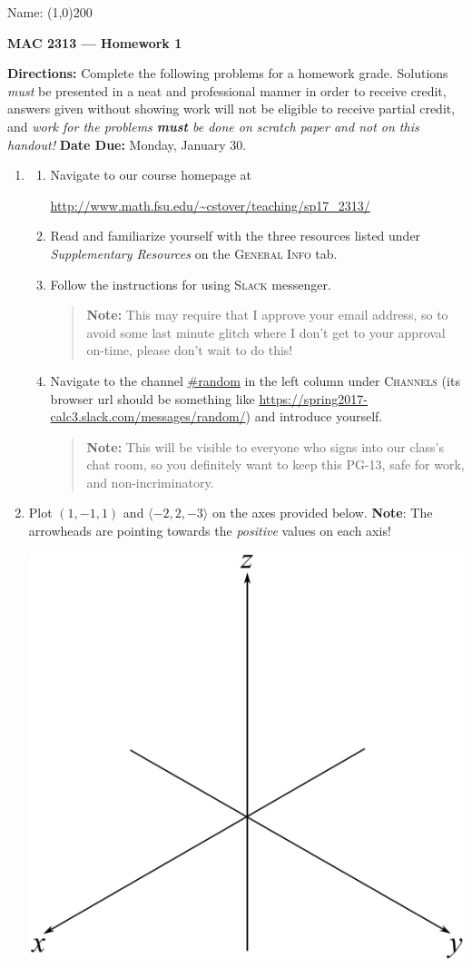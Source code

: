 \documentclass[12 pt]{article}
\newcommand{\note}[1]{\textbf{Note}: #1}
\newcommand{\axes}[1]{\begin{center}\includegraphics[scale=#1]{3DAxes}\end{center}}
\begin{document}
\begin{flushright}Name: \line(1,0){200}\end{flushright}
\begin{center}
\Large{\textbf{MAC 2313 --- Homework 1}}
\end{center}
\textbf{Directions:} Complete the following problems for a homework grade. Solutions \textit{must} be presented in a neat and professional manner in order to receive credit, answers given without showing work will not be eligible to receive partial credit, and \textit{work for the problems \textbf{must} be done on scratch paper and not on this handout!} \textbf{Date Due:} Monday, January 30.
\vspace{0.125in}
\begin{enumerate}[leftmargin=0in, rightmargin=-0.25in]
	\item 
	\begin{enumerate}[itemsep=0.125in]
		\item Navigate to our course homepage at
		\begin{center} \url{http://www.math.fsu.edu/~cstover/teaching/sp17_2313/}
		\end{center}
		\item Read and familiarize yourself with the three resources listed under \textit{Supplementary Resources} on the \textsc{General Info} tab.
		\item Follow the instructions for using \textsc{Slack} messenger.\begin{quote}\textbf{Note:} This may require that I approve your email address, so to avoid some last minute glitch where I don't get to your approval on-time, please don't wait to do this!\end{quote}
		\item Navigate to the channel \url{#random} in the left column under \textsc{Channels} (its browser url should be something like \url{https://spring2017-calc3.slack.com/messages/random/}) and introduce yourself.\begin{quote}\textbf{Note:} This will be visible to everyone who signs into our class's chat room, so you definitely want to keep this PG-13, safe for work, and non-incriminatory. {\Large\smiley}\end{quote}
	\end{enumerate}\vspace{-0.125in}
	
	\item Plot $(1,-1,1)$ and $\langle -2,2,-3\rangle$ on the axes provided below. \note{The arrowheads are pointing towards the \textit{positive} values on each axis!}
	\axes{0.333}


\end{enumerate}
\end{document}
